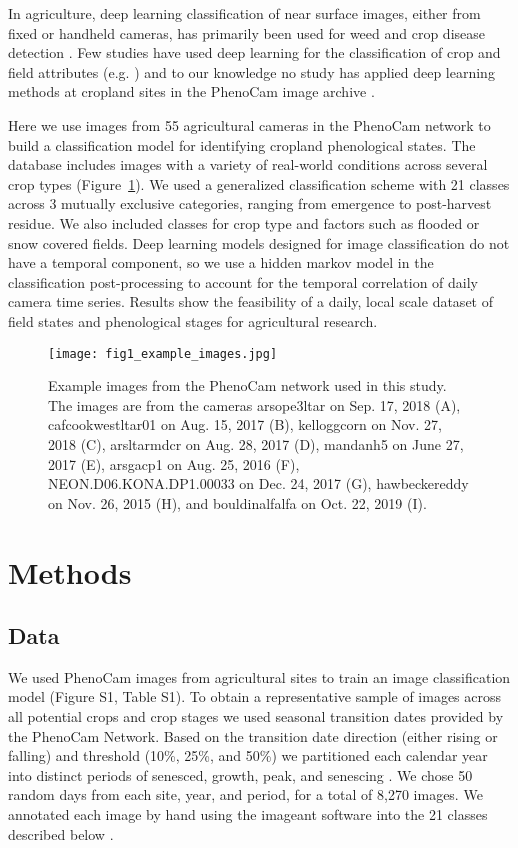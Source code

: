 \documentclass[remotesensing,article,submit,moreauthors,pdftex]{Definitions/mdpi}
\begin{document}
In agriculture, deep learning classification of near surface images, either from fixed or handheld cameras, has primarily been used for weed and crop disease detection \citep{benos2021}. Few studies have used deep learning for the classification of crop and field attributes (e.g. \cite{yalcin2017, han-shi2021}) and to our knowledge no study has applied deep learning methods at cropland sites in the PhenoCam image archive \citep{richardson2019}. 

Here we use images from 55 agricultural cameras in the PhenoCam network to build a classification model for identifying cropland phenological states. The database includes images with a variety of real-world conditions across several crop types (Figure~\ref{fig1}). We used a generalized classification scheme with 21 classes across 3 mutually exclusive categories, ranging from emergence to post-harvest residue. We also included classes for crop type and factors such as flooded or snow covered fields. Deep learning models designed for image classification do not have a temporal component, so we use a hidden markov model in the classification post-processing to account for the temporal correlation of daily camera time series. Results show the feasibility of a daily, local scale dataset of field states and phenological stages for agricultural research.

\begin{figure}[H]
    \texttt{[image: fig1\_example\_images.jpg]}
    \caption{Example images from the PhenoCam network used in this study. The images are from the cameras arsope3ltar on Sep. 17, 2018 (A), cafcookwestltar01 on Aug. 15, 2017 (B), kelloggcorn on Nov. 27, 2018 (C), arsltarmdcr on Aug. 28, 2017 (D), mandanh5 on June 27, 2017 (E),  arsgacp1 on Aug. 25, 2016 (F), NEON.D06.KONA.DP1.00033 on Dec. 24, 2017 (G), hawbeckereddy on Nov. 26, 2015 (H), and bouldinalfalfa on Oct. 22, 2019 (I).
}
    \label{fig1}
\end{figure}

\section{Methods}
\subsection{Data}

We used PhenoCam images from agricultural sites to train an image classification model (Figure S1, Table S1). To obtain a representative sample of images across all potential crops and crop stages we used seasonal transition dates provided by the PhenoCam Network. Based on the transition date direction (either rising or falling) and threshold (10\%, 25\%, and 50\%) we partitioned each calendar year into distinct periods of senesced, growth, peak, and senescing \citep{richardson2018a}. We chose 50 random days from each site, year, and period, for a total of 8,270 images. We annotated each image by hand using the imageant software into the 21 classes described below \citep{barve2019}.
\end{document}
